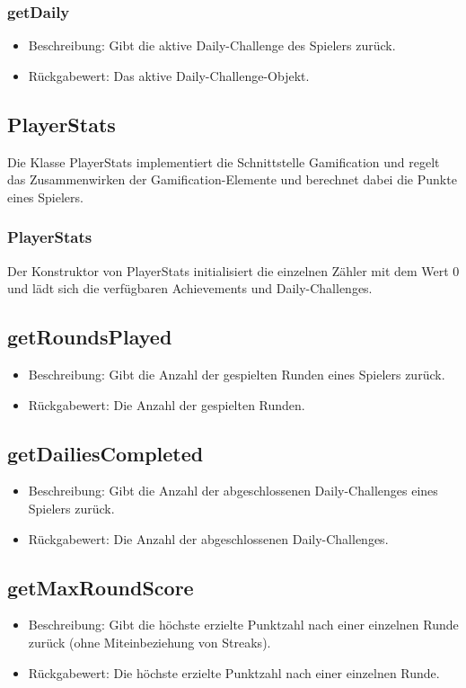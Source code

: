 \documentclass[a4paper]{scrreprt}
\begin{document}
    \subsubsection{getDaily}
    \begin{itemize}
        \item Beschreibung: Gibt die aktive Daily-Challenge des Spielers zurück.
        \item Rückgabewert: Das aktive Daily-Challenge-Objekt.
    \end{itemize}



    \subsection{PlayerStats}
    Die Klasse PlayerStats implementiert die Schnittstelle Gamification und regelt das Zusammenwirken der Gamification-Elemente und berechnet dabei die Punkte eines Spielers.

    \subsubsection{PlayerStats}
    Der Konstruktor von PlayerStats initialisiert die einzelnen Zähler mit dem Wert 0 und lädt sich die verfügbaren Achievements und Daily-Challenges.
    \subsection{getRoundsPlayed}
    \begin{itemize}
        \item Beschreibung: Gibt die Anzahl der gespielten Runden eines Spielers zurück.
        \item Rückgabewert: Die Anzahl der gespielten Runden.
    \end{itemize}
    \subsection{getDailiesCompleted}
    \begin{itemize}
        \item Beschreibung: Gibt die Anzahl der abgeschlossenen Daily-Challenges eines Spielers zurück.
        \item Rückgabewert: Die Anzahl der abgeschlossenen Daily-Challenges.
    \end{itemize}
    \subsection{getMaxRoundScore}
    \begin{itemize}
        \item Beschreibung: Gibt die höchste erzielte Punktzahl nach einer einzelnen Runde zurück (ohne Miteinbeziehung von Streaks).
        \item Rückgabewert: Die höchste erzielte Punktzahl nach einer einzelnen Runde.
    \end{itemize}
\end{document}
